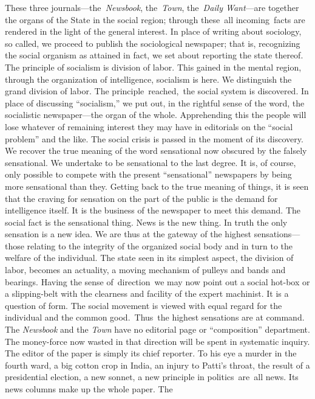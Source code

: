 \documentclass[openany,nobib]{tufte-book}
\begin{document}
These three journals---the\emph{~Newsbook}, the~\emph{Town},
the~\emph{Daily Want}---are together the organs of the State in the
social region; through these~all incoming~facts are rendered in the
light of the general interest. In place of writing about sociology, so
called, we proceed to publish the sociological newspaper; that is,
recognizing the social organism as attained in fact, we set about
reporting the state thereof. The principle of socialism is division of
labor. This gained in the mental region, through the organization of
intelligence, socialism is here. We distinguish the grand division of
labor. The principle~reached,~the social system is discovered. In place
of discussing ``socialism,'' we put out, in the rightful sense of the
word, the socialistic newspaper---the organ of the whole. Apprehending
this the people will lose whatever of remaining interest they may have
in editorials on the ``social problem'' and the like. The social crisis
is passed in the moment of its discovery. We recover the true meaning of
the word sensational now obscured by the falsely sensational. We
undertake to be sensational to the last degree. It is, of course, only
possible to compete with the present ``sensational'' newspapers by being
more sensational than they. Getting back to the true meaning of things,
it is seen that the craving for sensation on the part of the public is
the demand for intelligence itself. It is the business of the newspaper
to meet this demand. The social fact is the sensational thing. News is
the new thing. In truth the only sensation is a new idea. We are thus at
the gateway of the highest sensations---those relating to the integrity
of the organized social body and in turn to the welfare of the
individual. The state seen in its simplest aspect, the division of
labor, becomes an actuality, a moving mechanism of pulleys and bands and
bearings. Having the sense of~direction~we may now point out a social
hot-box or a slipping-belt with the clearness and facility of the expert
machinist. It is a question of form. The social movement is viewed with
equal regard for the individual and the common good.~Thus~the highest
sensations are at command. The \emph{Newsbook} and the \emph{Town} have
no editorial page or ``composition'' department. The money-force now
wasted in that direction will be spent in systematic inquiry. The editor
of the paper is simply its chief reporter. To his eye a murder in the
fourth ward, a big cotton crop in India, an injury to Patti's throat,
the result of a presidential election, a new sonnet, a new principle in
politics~are~all news. Its news columns make up the whole paper. The
\end{document}
